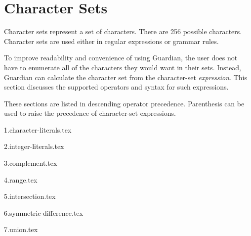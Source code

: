 
\section{Character Sets}
\label{subsec:charset}
{
	Character sets represent a set of characters. There are
	256 possible characters.
	Character sets are used either in regular
	expressions or grammar rules.
	
	To improve readability and convenience of using Guardian, the user does not
	have to enumerate all of the characters they would want in their sets.
	Instead, Guardian can calculate the character set from the character-set
	\textit{expression}. This section discusses the supported operators and
	syntax for such expressions.
	
	These sections are listed in descending operator precedence. Parenthesis
	can be used to raise the precedence of character-set expressions.
	
	{1.character-literals.tex}
	
	{2.integer-literals.tex}
	
	{3.complement.tex}
	
	{4.range.tex}
	
	{5.intersection.tex}
	
	{6.symmetric-difference.tex}
	
	{7.union.tex}
}

